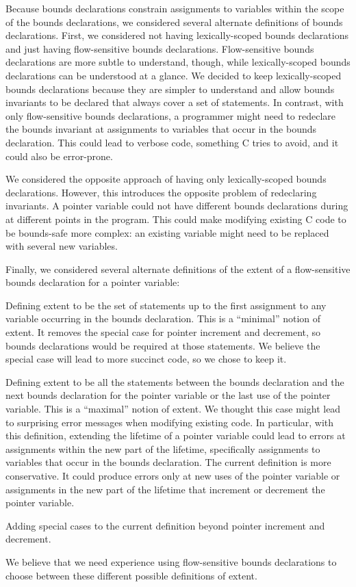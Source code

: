 Because bounds declarations constrain assignments to variables within the scope
of the bounds declarations, we considered several alternate definitions of 
bounds declarations.   First, we considered not having lexically-scoped bounds
declarations and just having flow-sensitive bounds declarations.  Flow-sensitive
bounds declarations are more subtle to understand, though, while lexically-scoped
bounds declarations can be understood at a glance.  We decided to keep
lexically-scoped bounds declarations because they are simpler to understand and
allow bounds invariants to be declared that always cover a set of statements.
In contrast, with only flow-sensitive bounds declarations, a programmer might need 
to redeclare the bounds invariant at  assignments to variables that occur in the
bounds declaration. This could lead to verbose code, something C tries to
avoid, and it could also be error-prone.

We considered the opposite approach of having only lexically-scoped
bounds declarations.   However, this introduces the opposite problem of
redeclaring invariants.  A pointer variable could not have different
bounds declarations during at different points in the program.  This could
make modifying existing C code to be bounds-safe more complex: an existing
variable might need to be replaced with several new variables.

Finally, we considered several alternate definitions of the extent of a
flow-sensitive bounds declaration for a pointer variable:
\begin{compactitem}
    \item Defining extent to be the set of statements up to the first assignment
          to any variable occurring in the bounds declaration.   This is a
          ``minimal'' notion of extent.  It removes the special case for
          pointer increment and decrement, so bounds
          declarations would be required at those statements.  We believe
          the special case will lead to more succinct code, so we chose to
          keep it.
    \item Defining extent to be all the statements between the bounds
          declaration and the next bounds declaration for
         the pointer variable or the last use of the pointer variable.  This
         is a ``maximal'' notion of extent.  We thought this case might
         lead to surprising error messages when modifying existing
         code.  In particular, with this definition, extending
         the lifetime of a pointer variable could lead to errors
         at assignments within the new part of the lifetime, specifically
         assignments to variables that occur in the bounds declaration.
         The current definition is more conservative.  It could produce errors
         only at new uses of the pointer variable or assignments in
         the new part of the lifetime that increment or decrement the pointer 
         variable.
  \item Adding special cases to the current definition beyond
        pointer increment and decrement.  
\end{compactitem}
We believe that we need experience using flow-sensitive bounds declarations
to choose between these different possible definitions of extent.

